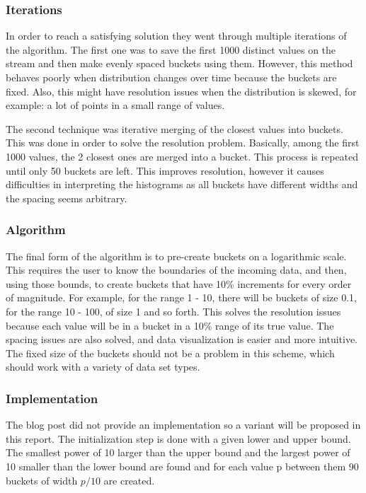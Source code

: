 \documentclass[12pt]{article}
\begin{document}
	\subsubsection{Iterations}
	In order to reach a satisfying solution they went through multiple iterations 
	of the algorithm. The first one was to save the first 1000 distinct values 
	on the stream and then make evenly spaced buckets using them. However, this 
	method behaves poorly when distribution changes over time because the buckets 
	are fixed. Also, this might have resolution issues when the distribution 
	is skewed, for example: a lot of points in a small range of values. 
	
	The second technique was iterative merging of the closest values into buckets. 
	This was done in order to solve the resolution problem. Basically, among the 
	first 1000 values, the 2 closest ones are merged into a bucket. This process 
	is repeated until only 50 buckets are left. This improves resolution, however 
	it causes difficulties in interpreting the histograms as all buckets have 
	different widths and the spacing seems arbitrary. 

	\subsubsection{Algorithm}
	The final form of the algorithm is to pre-create buckets on a logarithmic 
	scale. This requires the user to know the boundaries of the incoming data, 
	and then, using those bounds, to create buckets that have 10\% increments 
	for every order of magnitude. For example, for the range 1 - 10, there will be 
	buckets of size 0.1, for the range 10 - 100, of size 1 and so forth. This solves
	the resolution issues because each value will be in a bucket in a 10\% range 
	of its true value. The spacing issues are also solved, and data visualization
	is easier and more intuitive. The fixed size of the buckets should not be a 
	problem in this scheme, which should work with a variety of data set types.

	\subsubsection{Implementation}
	The blog post did not provide an implementation so a variant will be 
	proposed in this report. The initialization step is done with a given 
	lower and upper bound. The smallest power of 10 larger than the upper bound 
	and the largest power of 10 smaller than the lower bound are found and 
	for each value p between them 90 buckets of width $p / 10$ are created.
\end{document}

